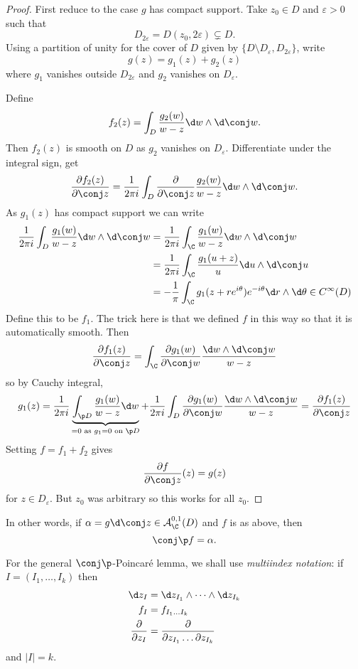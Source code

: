 \documentclass[a4paper]{article}
\newcommand{\w}{\wedge} %
\begin{document}
\begin{proof}
  First reduce to the case \(g\) has compact support. Take \(z_0 \in D\) and \(\varepsilon > 0\) such that
  \[
    D_{2\varepsilon} = D(z_0, 2\varepsilon) \subsetneq D.
  \]
  Using a partition of unity for the cover of \(D\) given by \(\{D \setminus D_\varepsilon, D_{2\varepsilon}\}\), write
  \[
    g(z) = g_1(z) + g_2(z)
  \]
  where \(g_1\) vanishes outside \(D_{2\varepsilon}\) and \(g_2\) vanishes on \(D_\varepsilon\).

  Define
  \[
    f_2(z) = \int_D \frac{g_2(w)}{w - z} \d w \w \d \conj w.
  \]
  Then \(f_2(z)\) is smooth on \(D\) as \(g_2\) vanishes on \(D_\varepsilon\). Differentiate under the integral sign, get
  \[
    \frac{\partial f_2(z)}{\partial \conj z} = \frac{1}{2\pi i} \int_D \frac{\partial  }{\partial \conj z} \frac{g_2(w)}{w - z} \d w \w \d \conj w.
  \]
  As \(g_1(z)\) has compact support we can write
  \begin{align*}
    \frac{1}{2\pi i} \int_D \frac{g_1(w)}{w - z} \d w \w \d\conj w
    &= \frac{1}{2\pi i} \int_\C \frac{g_1(w)}{w - z} \d w \w \d \conj w \\
    &= \frac{1}{2\pi i} \int_\C \frac{g_1(u + z)}{u} \d u \w \d \conj u \\
    &= -\frac{1}{\pi} \int_\C g_1(z + re^{i\theta}) e^{-i\theta} \d r \w \d\theta \in C^\infty(D)
  \end{align*}
  Define this to be \(f_1\). The trick here is that we defined \(f\) in this way so that it is automatically smooth. Then
  \[
    \frac{\partial f_1(z)}{\partial \conj z}
    = \int_\C \frac{\partial g_1(w)}{\partial \conj w} \frac{\d w \w \d \conj w}{w - z}
  \]
  so by Cauchy integral,
  \[
    g_1(z)
    = \frac{1}{2\pi i} \underbrace{\int_{\p D} \frac{g_1(w)}{w - z}\d w}_{= 0 \text{ as } g_1 = 0 \text{ on } \p D} + \frac{1}{2\pi i} \int_D \frac{\partial g_1(w)}{\partial \conj w} \frac{\d w \w \d\conj w}{w - z}
    = \frac{\partial f_1(z)}{\partial \conj z}
  \]
  Setting \(f = f_1 + f_2\) gives
  \[
    \frac{\partial f}{\partial \conj z}(z) = g(z)
  \]
  for \(z \in D_\varepsilon\). But \(z_0\) was arbitrary so this works for all \(z_0\).
\end{proof}

In other words, if \(\alpha = g \d \conj z \in \mathcal A_\C^{0, 1}(D)\) and \(f\) is as above, then
\[
  \conj \p f = \alpha.
\]

For the general \(\conj \p\)-Poincaré lemma, we shall use \emph{multiindex notation}: if \(I = (I_1, \dots, I_k)\) then
\begin{align*}
  \d z_I &= \d z_{I_1} \w \dots \w \d z_{I_k} \\
  f_I &= f_{I_1 \dots I_k} \\
  \frac{\partial  }{\partial z_I} &= \frac{\partial }{\partial z_{I_1} \dots \partial z_{I_k}}
\end{align*}
and \(|I| = k\).
\end{document}
